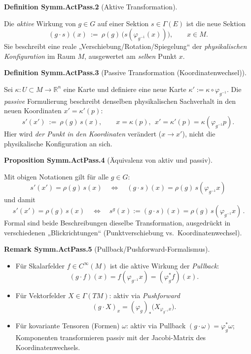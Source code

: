 \documentclass[10pt, letterpaper]{article}
\newcommand{\R}{\mathbb{R}}
\newcommand{\CustomHeading}[3]{%
  \par\medskip\noindent%
  \textbf{#1 #2} \textnormal{(#3)}.\enskip%
}
\newenvironment{DEF}[2]{\begin{unitbox}\CustomHeading{Definition}{#1}{#2}}{\end{unitbox}}
\newenvironment{PROP}[2]{\begin{unitbox}\CustomHeading{Proposition}{#1}{#2}}{\end{unitbox}}
\newenvironment{REM}[2]{\begin{unitbox}\CustomHeading{Remark}{#1}{#2}}{\end{unitbox}}
\begin{document}
\begin{DEF}{Symm.ActPass.2}{Aktive Transformation}
Die \emph{aktive} Wirkung von $g\in G$ auf einer Sektion $s\in\Gamma(E)$ ist die neue Sektion
\[
(g\cdot s)(x)\ :=\ \rho(g)\,\bigl(s(\varphi_{g^{-1}}(x))\bigr),\qquad x\in M.
\]
Sie beschreibt eine reale „Verschiebung/Rotation/Spiegelung“ der \emph{physikalischen Konfiguration} im Raum $M$, ausgewertet am \emph{selben} Punkt $x$.
\end{DEF}

\begin{DEF}{Symm.ActPass.3}{Passive Transformation (Koordinatenwechsel)}
Sei $\kappa:U\subset M\to \R^n$ eine Karte und definiere eine neue Karte $\kappa':=\kappa\circ\varphi_{g^{-1}}$.
Die \emph{passive} Formulierung beschreibt denselben physikalischen Sachverhalt in den neuen Koordinaten $x'=\kappa'(p)$:
\[
s'(x')\ :=\ \rho(g)\,s(x),\qquad x=\kappa(p),\ \ x'=\kappa'(p)=\kappa(\varphi_{g^{-1}}p).
\]
Hier wird \emph{der Punkt in den Koordinaten} verändert ($x\to x'$), nicht die physikalische Konfiguration an sich.
\end{DEF}

\begin{PROP}{Symm.ActPass.4}{Äquivalenz von aktiv und passiv}
Mit obigen Notationen gilt für alle $g\in G$:
\[
\boxed{\,s'(x')=\rho(g)\,s(x)\quad\Longleftrightarrow\quad (g\cdot s)(x)=\rho(g)\,s(\varphi_{g^{-1}}x)\,}
\]
und damit
\[
\boxed{\,s'(x')=\rho(g)\,s(x)\quad\Longleftrightarrow\quad s^{g}(x):=(g\cdot s)(x)=\rho(g)\,s(\varphi_{g^{-1}}x)\, .}
\]
Formal sind beide Beschreibungen dieselbe Transformation, ausgedrückt in verschiedenen „Blickrichtungen“ (Punktverschiebung vs.\ Koordinatenwechsel).
\end{PROP}

\begin{REM}{Symm.ActPass.5}{Pullback/Pushforward-Formalismus}
\begin{itemize}
  \item Für Skalarfelder $f\in C^\infty(M)$ ist die aktive Wirkung der \emph{Pullback}:
  \[
    (g\cdot f)(x)=f(\varphi_{g^{-1}}x)=(\varphi_g^{*}f)(x).
  \]
  \item Für Vektorfelder $X\in\Gamma(TM)$: aktiv via \emph{Pushforward}
  \[
    (g\cdot X)_x=(\varphi_g)_*\bigl(X_{\varphi_{g^{-1}}x}\bigr).
  \]
  \item Für kovariante Tensoren (Formen) $\omega$: aktiv via Pullback $(g\cdot\omega)=\varphi_g^*\omega$; Komponenten transformieren passiv mit der Jacobi-Matrix des Koordinatenwechsels.
\end{itemize}
\end{REM}
\end{document}
